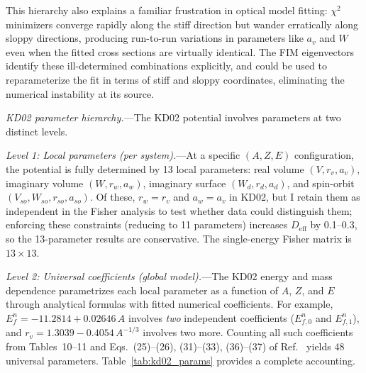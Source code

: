 \documentclass[aps,prl,reprint,superscriptaddress,showpacs]{revtex4-2}
\begin{document}
This hierarchy also explains a familiar frustration in optical model fitting: $\chi^2$ minimizers converge rapidly along the stiff direction but wander erratically along sloppy directions, producing run-to-run variations in parameters like $a_v$ and $W$ even when the fitted cross sections are virtually identical. The FIM eigenvectors identify these ill-determined combinations explicitly, and could be used to reparameterize the fit in terms of stiff and sloppy coordinates, eliminating the numerical instability at its source.

\textit{KD02 parameter hierarchy.}---The KD02 potential involves parameters at two distinct levels.

\emph{Level 1: Local parameters (per system).}---At a specific $(A, Z, E)$ configuration, the potential is fully determined by 13 local parameters: real volume $(V, r_v, a_v)$, imaginary volume $(W, r_w, a_w)$, imaginary surface $(W_d, r_d, a_d)$, and spin-orbit $(V_{so}, W_{so}, r_{so}, a_{so})$. Of these, $r_w = r_v$ and $a_w = a_v$ in KD02, but I retain them as independent in the Fisher analysis to test whether data could distinguish them; enforcing these constraints (reducing to 11 parameters) increases $D_\mathrm{eff}$ by 0.1--0.3, so the 13-parameter results are conservative. The single-energy Fisher matrix is $13 \times 13$.

\emph{Level 2: Universal coefficients (global model).}---The KD02 energy and mass dependence parametrizes each local parameter as a function of $A$, $Z$, and $E$ through analytical formulas with fitted numerical coefficients. For example, $E_f^n = -11.2814 + 0.02646\,A$ involves \emph{two} independent coefficients ($E_{f,0}^n$ and $E_{f,1}^n$), and $r_v = 1.3039 - 0.4054\,A^{-1/3}$ involves two more. Counting all such coefficients from Tables~10--11 and Eqs.~(25)--(26), (31)--(33), (36)--(37) of Ref.~\cite{Koning2003} yields 48 universal parameters. Table~\ref{tab:kd02_params} provides a complete accounting.
\end{document}
